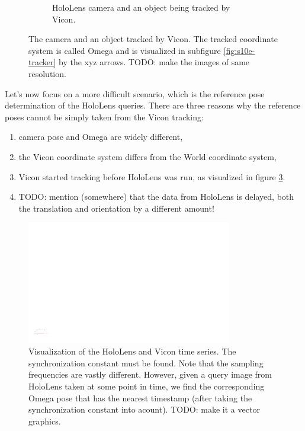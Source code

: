 \documentclass[twoside]{ctuthesis}
\theoremstyle{plain}
\theoremstyle{definition}
\theoremstyle{note}
\begin{document}
\begin{figure}
\begin{subfigure}{0.45\textwidth}
		\caption{HoloLens camera and an object being tracked by Vicon.}
		\label{fig:holoLens-tracker}
	\end{subfigure}
	\caption{The camera and an object tracked by Vicon. The tracked coordinate system is called Omega and is visualized in subfigure \ref{fig:s10e-tracker} by the xyz arrows. TODO: make the images of same resolution.}
	\label{fig:camera-trackers}
\end{figure}

Let's now focus on a more difficult scenario, which is the reference pose determination of the HoloLens queries. There are three reasons why the reference poses cannot be simply taken from the Vicon tracking:

\begin{enumerate}
	\item camera pose and Omega are widely different,
	\item the Vicon coordinate system differs from the World coordinate system,
	\item Vicon started tracking before HoloLens was run, as visualized in figure \ref{fig:HL_and_vicon_time}.
	\item TODO: mention (somewhere) that the data from HoloLens is delayed, both the translation and orientation by a different amount!
\end{enumerate}

\begin{figure}
	\centering
 	\includegraphics[width=0.80\textwidth]{HL_and_vicon_time}
 	\caption{Visualization of the HoloLens and Vicon time series. The synchronization constant must be found. Note that the sampling frequencies are vastly different. However, given a query image from HoloLens taken at some point in time, we find the corresponding Omega pose that has the nearest timestamp (after taking the synchronization constant into acount). TODO: make it a vector graphics.}
 	\label{fig:HL_and_vicon_time}
\end{figure} 
\end{document}

